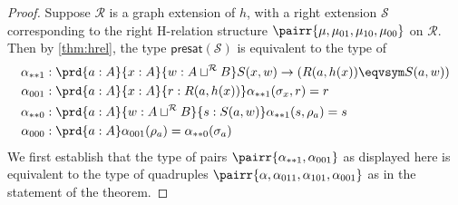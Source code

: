 \begin{proof}
Suppose $\mathcal{R}$ is a graph extension of $h$, with a right extension $\mathcal{S}$ corresponding to the right H-relation structure $\pairr{\mu,\mu_{01},\mu_{10},\mu_{00}}$ on $\mathcal{R}$. Then by \autoref{thm:hrel}, the type $\mathsf{presat}(\mathcal{S})$ is equivalent to the type of
\begin{align*}
\alpha_{\ast\ast 1} & : \prd{a:A}{x:A}{w:A\sqcup^{\mathcal{R}}B} S(x,w)\to (R(a,h(x)) \eqvsym S(a,w)) \\
\alpha_{001} & : \prd{a:A}{x:A}{r:R(a,h(x))} \alpha_{\ast\ast 1}(\sigma_x,r)=r \\
\alpha_{\ast\ast 0} & : \prd{a:A}{w:A\sqcup^{\mathcal{R}} B}{s:S(a,w)} \alpha_{\ast\ast 1}(s,\rho_a)=s \\
\alpha_{000} & : \prd{a:A} \alpha_{001}(\rho_a)=\alpha_{\ast\ast 0}(\sigma_a)
\end{align*}
We first establish that the type of pairs $\pairr{\alpha_{\ast\ast 1},\alpha_{001}}$ as displayed here is equivalent to the type of quadruples $\pairr{\alpha,\alpha_{011},\alpha_{101},\alpha_{001}}$ as in the statement of the theorem.


\end{proof}

